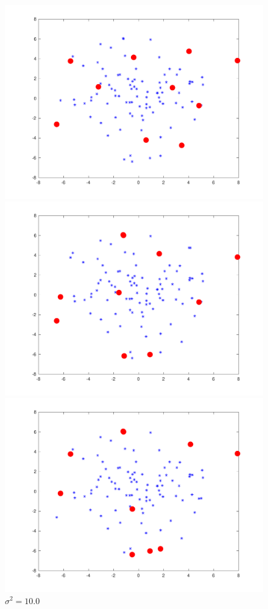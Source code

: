 \begin{figure}
\begin{minipage}{\linewidth}
    \caption*{$\sigma^2=0.1$}
\includegraphics[width=\linewidth]{../src/figures/fixedsize/fixedsize_100}
    \caption*{$\sigma^2=1.0$}
\includegraphics[width=\linewidth]{../src/figures/fixedsize/fixedsize_1000}
    \caption*{$\sigma^2=10.0$}
\includegraphics[width=\linewidth]{../src/figures/fixedsize/fixedsize_10000}

\end{minipage}
\end{figure}
